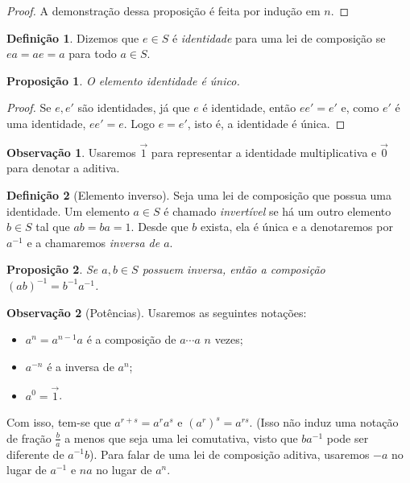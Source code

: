 \documentclass[a4paper,12pt]{report}
\theoremstyle{plain}
\newtheorem{proposicao}{Proposição}[section]
\theoremstyle{definition}
\newtheorem{definicao}{Definição}[section]
\newtheorem{observacao}{Observação}[section]
\begin{document}
\begin{proof}
	A demonstração dessa proposição é feita por indução em \(n\).
\end{proof}

\begin{definicao}
	Dizemos que \(e\in S\) é \emph{identidade} para uma lei de composição se \(ea = ae = a\) para todo \(a\in S\).
\end{definicao}

\begin{proposicao}
	O elemento identidade é único.
\end{proposicao}
\begin{proof}
	Se \(e,e'\) são identidades, já que \(e\) é identidade, então \(ee' = e'\) e, como $e'$ é uma identidade, \(ee' = e\). Logo \(e = e'\), isto é, a identidade é única.
\end{proof}

\begin{observacao}
	Usaremos $\vec{1}$ para representar a identidade multiplicativa e $\vec{0}$ para denotar a aditiva.
\end{observacao}

\begin{definicao}[Elemento inverso]
	Seja uma lei de composição que possua uma identidade. Um elemento \(a\in S\) é chamado \emph{invertível} se há um outro elemento \(b\in S\) tal que \(ab = ba = 1\). Desde que \(b\) exista, ela é única e a denotaremos por \(a^{-1}\) e a chamaremos
	\emph{inversa de $a$}.
\end{definicao}


\begin{proposicao}
	Se \(a,b\in S\) possuem inversa, então a composição \((ab)^{-1} = b^{-1}a^{-1}\).
\end{proposicao}

\begin{observacao}[Potências]
	Usaremos as seguintes notações:
	\begin{itemize}
		\item \(a^n = a^{n-1}a\) é a composição de \(a\dotsb a\) \(n\) vezes;
		\item \(a^{-n}\) é a inversa de \(a^n\);
		\item \(a^0 = \vec{1}\).
	\end{itemize}

	Com isso, tem-se que \(a^{r+s} = a^ra^s\) e \((a^r)^s = a^{rs}\). (Isso
	não induz uma notação de fração \(\frac{b}{a}\) a menos que seja uma lei
	comutativa, visto que \(ba^{-1}\) pode ser diferente de \(a^{-1}b\)).
	Para falar de uma lei de composição aditiva, usaremos \(-a\) no lugar de
	\(a^{-1}\) e \(na\) no lugar de \(a^n\).
\end{observacao}
\end{document}
